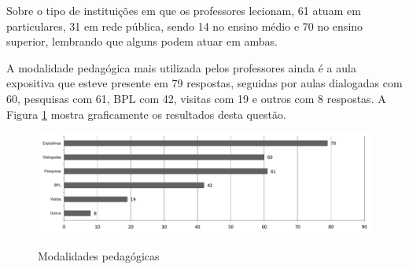 Sobre o tipo de instituições em que os professores lecionam, 61 atuam em particulares, 31 em rede pública, sendo 14 no ensino médio e 70 no ensino superior, lembrando que alguns podem atuar em ambas. 

 



A modalidade pedagógica mais utilizada pelos professores ainda é a aula expositiva que esteve presente em 79 respostas, seguidas por aulas dialogadas com 60, pesquisas com 61, BPL com 42, visitas com 19 e outros com 8 respostas. A Figura \ref{fig:grafico_modalidade} mostra graficamente os resultados desta questão. 


 
\begin{figure}
\centering
\caption{Modalidades pedagógicas}
\includegraphics[width=1.0\textwidth]{pdfs/professores/img-grafico-modalidade.pdf} 
\label{fig:grafico_modalidade} 
\end{figure}


